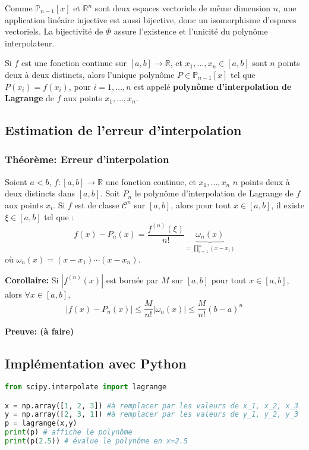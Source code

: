 \documentclass[oneside]{book}
\begin{document}
Comme $\mathbb{P}_{n-1}[x]$ et $\mathbb{R}^n$ sont deux espaces vectoriels de même dimension $n$, une application linéaire injective est aussi bijective, donc un isomorphisme d'espaces vectoriels. La bijectivité de $\Phi$ assure l'existence et l'unicité du polynôme interpolateur.

\begin{definition}
Si $f$ est une fonction continue sur $[a,b] \to \mathbb{R}$, et $x_1, \dots, x_n \in [a,b]$ sont $n$ points deux à deux distincts, alors l'unique polynôme $P \in \mathbb{P}_{n-1}[x]$ tel que $P(x_i) = f(x_i)$, pour $i=1, \dots, n$ est appelé \textbf{polynôme d'interpolation de Lagrange} de $f$ aux points $x_1, \dots, x_n$.
\end{definition}

\subsection{Estimation de l'erreur d'interpolation}

\subsubsection{Théorème: Erreur d'interpolation}

\begin{theorem}
Soient $a < b$, $f: [a,b] \to \mathbb{R}$ une fonction continue, et $x_1, \dots, x_n$ $n$ points deux à deux distincts dans $[a,b]$.
Soit $P_n$ le polynôme d'interpolation de Lagrange de $f$ aux points $x_i$.
Si $f$ est de classe $\mathcal{C}^n$ sur $[a,b]$, alors pour tout $x \in [a,b]$, il existe $\xi \in [a,b]$ tel que :
\[
f(x) - P_n(x) = \frac{f^{(n)}(\xi)}{n!} \underbrace{\omega_n(x)}_{= \prod_{i=1}^n (x-x_i)}
\]
où $\omega_n(x) = (x-x_1) \cdots (x-x_n)$.
\end{theorem}

\textbf{Corollaire:}
Si $|f^{(n)}(x)|$ est bornée par $M$ sur $[a,b]$ pour tout $x \in [a,b]$, alors $\forall x \in [a,b]$,
\[
|f(x) - P_n(x)| \le \frac{M}{n!} |\omega_n(x)| \le \frac{M}{n!} (b-a)^n
\]

\textbf{Preuve: (à faire)}

\subsection{Implémentation avec Python}

\begin{lstlisting}[language=Python]
from scipy.interpolate import lagrange

x = np.array([1, 2, 3]) #à remplacer par les valeurs de x_1, x_2, x_3
y = np.array([2, 3, 1]) #à remplacer par les valeurs de y_1, y_2, y_3
p = lagrange(x,y)
print(p) # affiche le polynôme
print(p(2.5)) # évalue le polynôme en x=2.5
\end{lstlisting}
\end{document}
